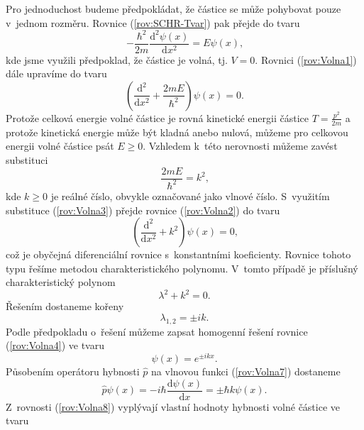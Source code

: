 Pro jednoduchost budeme předpokládat, že částice se může pohybovat pouze v~jednom rozměru. Rovnice (\ref{rov:SCHR-Tvar}) pak přejde do tvaru
\begin{equation}
-\frac{\hbar^2}{2m} \frac{\mathrm{d}^2\psi(x)}{\mathrm{d}x^2} = E \psi(x) \mbox{,}
\label{rov:Volna1}
\end{equation}
kde jsme využili předpoklad, že částice je volná, tj. $V = 0$. Rovnici (\ref{rov:Volna1}) dále upravíme do tvaru
\begin{equation}
\left( \frac{\mathrm{d}^2}{\mathrm{d}x^2} + \frac{2mE}{\hbar^2} \right) \psi(x) = 0 \mbox{.}
\label{rov:Volna2}
\end{equation}
Protože celková energie volné částice je rovná kinetické energii částice $T=\frac{p^2}{2m}$ a protože kinetická energie může být kladná anebo nulová, můžeme pro celkovou energii volné částice psát $E \geq 0$. Vzhledem k~této nerovnosti můžeme zavést substituci
\begin{equation}
\frac{2mE}{\hbar^2} = k^2 \mbox{,}
\label{rov:Volna3}
\end{equation}
kde $k\geq0$ je reálné číslo, obvykle označované jako vlnové číslo. S~využitím substituce (\ref{rov:Volna3}) přejde rovnice (\ref{rov:Volna2}) do tvaru
\begin{equation}
\left( \frac{\mathrm{d}^2}{\mathrm{d}x^2} + k^2 \right) \psi(x) = 0 \mbox{,}
\label{rov:Volna4}
\end{equation}
což je obyčejná diferenciální rovnice s~konstantními koeficienty. Rovnice tohoto typu řešíme metodou charakteristického polynomu. V~tomto případě je příslušný charakteristický polynom
\begin{equation}
\lambda^2 + k^2 = 0 \mbox{.}
\label{rov:Volna5}
\end{equation}
Řešením dostaneme kořeny
\begin{equation}
\lambda_{1,2} = \pm ik \mbox{.}
\label{rov:Volna6}
\end{equation}
Podle předpokladu o~řešení můžeme zapsat homogenní řešení rovnice (\ref{rov:Volna4}) ve tvaru
\begin{equation}
\psi(x) = e^{\pm ikx} \mbox{.}
\label{rov:Volna7}
\end{equation}
Působením operátoru hybnosti  $\hat{p}$ na vlnovou funkci (\ref{rov:Volna7}) dostaneme
\begin{equation}
\hat{p} \psi(x) = -i\hbar \frac{\mathrm{d}\psi(x)}{\mathrm{d}x} = \pm \hbar k \psi(x) \mbox{.}
\label{rov:Volna8}
\end{equation}
Z~rovnosti (\ref{rov:Volna8}) vyplývají vlastní hodnoty hybnosti volné částice ve tvaru
